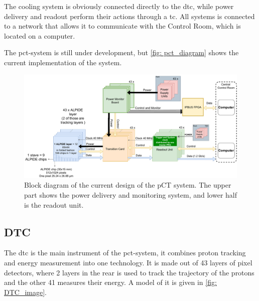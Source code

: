 \documentclass[main.tex]{subfiles}
\begin{document}
The cooling system is obviously connected directly to the \gls{dtc}, while power delivery and readout perform their actions through a \gls{tc}. All systems is connected to a network that allows it to communicate with the Control Room, which is located on a computer.

The \gls{pct}-system is still under development, but \autoref{fig: pct_diagram} shows the current implementation of the system.

\begin{figure}[!ht]
    \centering
    \includegraphics[scale=0.4]{images/pCT_Current_layout-CurrentSystemOverview.pdf}
    \caption{Block diagram of the current design of the pCT system. The upper part shows the power delivery and monitoring system, and lower half is the readout unit.}
    \label{fig: pct_diagram}
\end{figure}
\FloatBarrier


\subsection{DTC}

The \gls{dtc} is the main instrument of the \gls{pct}-system, it combines proton tracking and energy measurement into one technology. It is made out of 43 layers of pixel detectors, where 2 layers in the rear is used to track the trajectory of the protons and the other 41 measures their energy. A model of it is given in \autoref{fig: DTC_image}.
\end{document}

